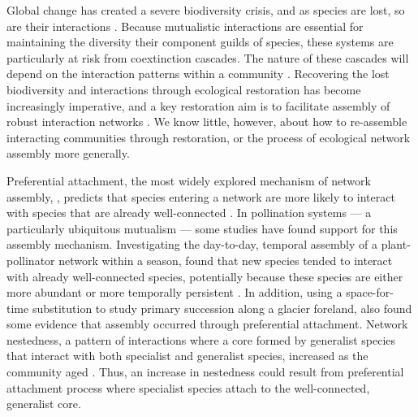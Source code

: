 \documentclass[12pt]{article}
\begin{document}
Global change has created a severe biodiversity crisis, and as species
are lost, so are their interactions \citep{dunn2009sixth,
  barnosky2011has}. Because mutualistic interactions are essential for
maintaining the diversity their component guilds of species, these
systems are particularly at risk from coextinction cascades. The
nature of these cascades will depend on the interaction patterns
within a community \citep{Memmott2004, Rezende2007,
  Bascompte2009}. Recovering the lost biodiversity and interactions
through ecological restoration has become increasingly imperative, and
a key restoration aim is to facilitate assembly of robust interaction
networks \citep{menz-2010-4}. We know little, however, about how to
re-assemble interacting communities through restoration, or the
process of ecological network assembly more generally.

Preferential attachment, the most widely explored mechanism of network
assembly, \citep{barabasi1999emergence}, predicts that species
entering a network are more likely to interact with species that are
already well-connected \citep[''the rich-get-richer''
principle,][]{barabasi1999emergence}. In pollination systems --- a
particularly ubiquitous mutualism \citep{ollerton-2011-321,
  klein-2007-303} --- some studies have found support for this
assembly mechanism. Investigating the day-to-day, temporal assembly of
a plant-pollinator network within a season, \cite{Olesen2008} found
that new species tended to interact with already well-connected
species, potentially because these species are either more abundant or
more temporally persistent \citep{Olesen2008}. In addition, using a
space-for-time substitution to study primary succession along a
glacier foreland, \cite{albrecht2010plant} also found some evidence
that assembly occurred through preferential attachment. Network
nestedness, a pattern of interactions where a core formed by
generalist species that interact with both specialist and generalist
species, increased as the community aged
\citep{albrecht2010plant}. Thus, an increase in nestedness could
result from preferential attachment process where specialist species
attach to the well-connected, generalist core.  %
\end{document}
